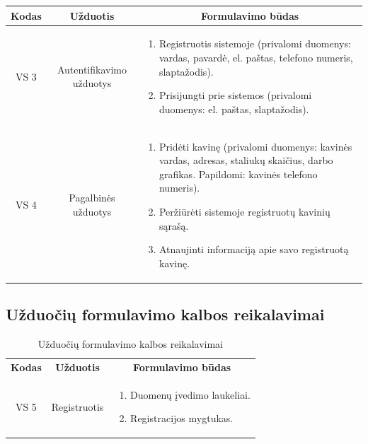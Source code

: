 \documentclass{VUMIFPSkursinis}
\begin{document}
{{{{{\begin{center}
\begin{table}[H]
\begin{tabular}{|p{2cm}|p{}|p{}|}
	\hline
		\multicolumn{1}{|c|}{{\bfseries Kodas}}&
		\multicolumn{1}{|c|}{{\bfseries Užduotis}}&
		\multicolumn{1}{|c|}{{\bfseries Formulavimo būdas}}\\		
	\hline
		\multicolumn{1}{|c|}{VS 3}&  	
		\multicolumn{1}{|c|}{Autentifikavimo užduotys}&
		{
			\begin{enumerate}
				\item Registruotis sistemoje (privalomi duomenys: vardas, pavardė, el. paštas, telefono numeris, slaptažodis).
				\item Prisijungti prie sistemos (privalomi duomenys: el. paštas, slaptažodis).
			\end{enumerate}}\\
	\hline
		\multicolumn{1}{|c|}{VS 4}&
		\multicolumn{1}{|c|}{Pagalbinės užduotys}&
		{
			\begin{enumerate}
				\item Pridėti kavinę (privalomi duomenys: kavinės vardas, adresas, staliukų skaičius, darbo grafikas. Papildomi: kavinės telefono numeris).
				\item Peržiūrėti sistemoje registruotų kavinių sąrašą.
				\item Atnaujinti informaciją apie savo registruotą kavinę.
			\end{enumerate}}\\
	
	\hline 	 	
	\end{tabular}
	
	\label{table:2}
	\end{table}

\end{center}

\subsection{Užduočių formulavimo kalbos reikalavimai}
\begin{center}

	\begin{longtable}{|p{2cm}|p{}|p{}|}
	\caption{Užduočių formulavimo kalbos reikalavimai}
	\label{table:3}	
	\endfirsthead
	\endhead
	\hline
	    \rowcolor{lightgray}
		\multicolumn{3}{|c|}{Užduočių formulavimo kalbos reikalavimai}\\
		
	\hline
		\multicolumn{1}{|c|}{{\bfseries Kodas}}&
		\multicolumn{1}{|c|}{{\bfseries Užduotis}}&
		\multicolumn{1}{|c|}{{\bfseries Formulavimo būdas}}\\		
	\hline
		\multicolumn{1}{|c|}{VS 5}& 	
		{Registruotis}&
		\multicolumn{1}{|p{8,6cm}|}{
			\begin{enumerate}
				\item Duomenų įvedimo laukeliai.
				\item Registracijos mygtukas.
			\end{enumerate}}\\
	

\end{longtable}
\end{center}}}}}}
\end{document}
